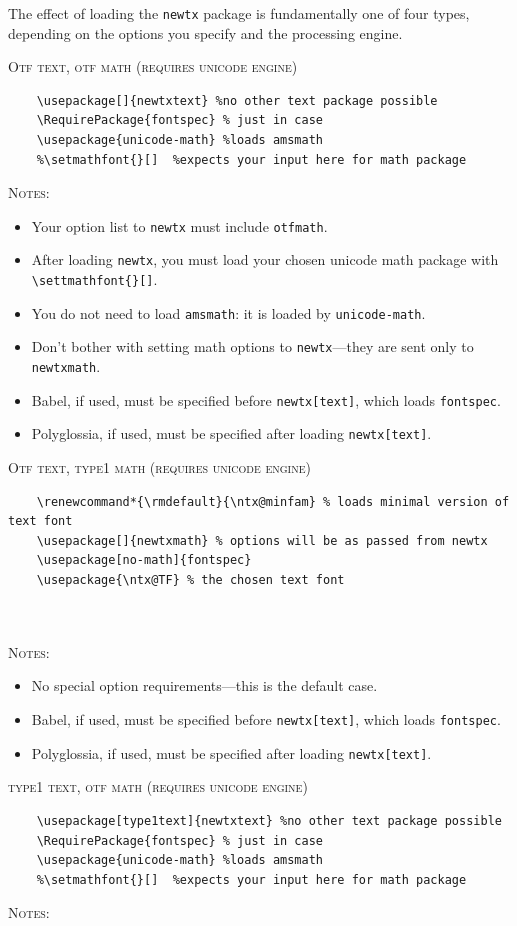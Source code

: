 \documentclass[\fsc]{article}
\theoremstyle{oldplain}
\theoremstyle{plain}
\begin{document}
The effect of loading the {\tt newtx} package is fundamentally one of four types, depending on the options you specify and the processing engine.

\textsc{Otf text, otf math (requires unicode engine)}
\begin{verbatim}
    \usepackage[]{newtxtext} %no other text package possible
    \RequirePackage{fontspec} % just in case
    \usepackage{unicode-math} %loads amsmath
    %\setmathfont{}[]  %expects your input here for math package
\end{verbatim}
\textsc{Notes:}
\begin{itemize}
\item Your option list to {\tt newtx} must include {\tt otfmath}. 
\item After loading {\tt newtx}, you must load your chosen unicode math package with \verb|\settmathfont{}[]|.
\item
You do not need to load {\tt amsmath}: it is loaded by {\tt unicode-math}.
\item Don't bother with setting math options to {\tt newtx}---they are sent only to {\tt newtxmath}.
\item Babel, if used, must be specified before {\tt newtx[text]}, which loads {\tt fontspec}.
\item Polyglossia, if used, must be specified after loading {\tt newtx[text]}.
\end{itemize}

\textsc{Otf text, type1 math (requires unicode engine)}
\begin{verbatim}
    \renewcommand*{\rmdefault}{\ntx@minfam} % loads minimal version of text font   
    \usepackage[]{newtxmath} % options will be as passed from newtx
    \usepackage[no-math]{fontspec}
    \usepackage{\ntx@TF} % the chosen text font
    
    
\end{verbatim}
\textsc{Notes:}
\begin{itemize}
\item No special option requirements---this is the default case.
\item Babel, if used, must be specified before {\tt newtx[text]}, which loads {\tt fontspec}.
\item Polyglossia, if used, must be specified after loading {\tt newtx[text]}.
\end{itemize}


\textsc{type1 text, otf math (requires unicode engine)}
\begin{verbatim}
    \usepackage[type1text]{newtxtext} %no other text package possible
    \RequirePackage{fontspec} % just in case
    \usepackage{unicode-math} %loads amsmath
    %\setmathfont{}[]  %expects your input here for math package
\end{verbatim}
\textsc{Notes:}
\end{document}

